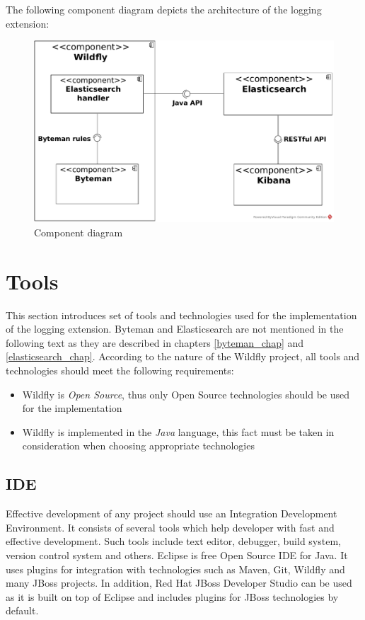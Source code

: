 \documentclass[12pt,oneside]{fithesis2}
\begin{document}
The following component diagram depicts the architecture of the logging extension:

\begin{figure}[ht!]
	\centering
	\includegraphics[width=\textwidth]{images/component_diagram}
	\caption{Component diagram}
	\label{component_diagram}
\end{figure}

\section{Tools}
This section introduces set of tools and technologies used for the implementation of the logging extension. Byteman and Elasticsearch are not mentioned in the following text as they are described in chapters \ref{byteman_chap} and \ref{elasticsearch_chap}. According to the nature of the Wildfly project, all tools and technologies should meet the following requirements:

\begin{itemize}
	\item Wildfly is \textit{Open Source}, thus only Open Source technologies should be used for the implementation
	\item Wildfly is implemented in the \textit{Java} language, this fact must be taken in consideration when choosing appropriate technologies
\end{itemize}

\subsection{IDE}
Effective development of any project should use an Integration Development Environment. It consists of several tools which help developer with fast and effective development. Such tools include text editor, debugger, build system, version control system and others. Eclipse is free Open Source IDE for Java. It uses plugins for integration with technologies such as Maven, Git, Wildfly and many JBoss projects. In addition, Red Hat JBoss Developer Studio can be used as it is built on top of Eclipse and includes plugins for JBoss technologies by default.
\end{document}
